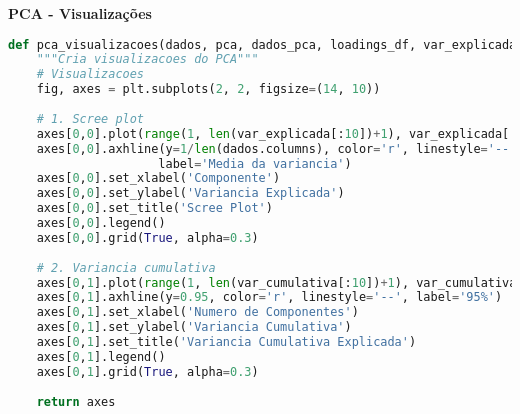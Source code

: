 \begin{researchbox}
\textbf{PCA - Visualizações}

\begin{lstlisting}[language=Python]
def pca_visualizacoes(dados, pca, dados_pca, loadings_df, var_explicada, var_cumulativa, n_componentes):
    """Cria visualizacoes do PCA"""
    # Visualizacoes
    fig, axes = plt.subplots(2, 2, figsize=(14, 10))
    
    # 1. Scree plot
    axes[0,0].plot(range(1, len(var_explicada[:10])+1), var_explicada[:10], 'bo-')
    axes[0,0].axhline(y=1/len(dados.columns), color='r', linestyle='--', 
                     label='Media da variancia')
    axes[0,0].set_xlabel('Componente')
    axes[0,0].set_ylabel('Variancia Explicada')
    axes[0,0].set_title('Scree Plot')
    axes[0,0].legend()
    axes[0,0].grid(True, alpha=0.3)
    
    # 2. Variancia cumulativa
    axes[0,1].plot(range(1, len(var_cumulativa[:10])+1), var_cumulativa[:10], 'go-')
    axes[0,1].axhline(y=0.95, color='r', linestyle='--', label='95%')
    axes[0,1].set_xlabel('Numero de Componentes')
    axes[0,1].set_ylabel('Variancia Cumulativa')
    axes[0,1].set_title('Variancia Cumulativa Explicada')
    axes[0,1].legend()
    axes[0,1].grid(True, alpha=0.3)
    
    return axes
\end{lstlisting}
\end{researchbox}

